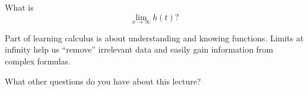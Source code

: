 \documentclass{ximera}
\begin{document}
\begin{question}
What is 
\[
\lim_{x\to\infty} h(t)?
\]
\begin{multipleChoice}
\end{multipleChoice}
\end{question}

Part of learning calculus is about understanding and knowing
functions. Limits at infinity help us ``remove'' irrelevant data and
easily gain information from complex formulas.

\begin{question}
What other questions do you have about this lecture?
\begin{freeResponse}
\end{freeResponse}
\end{question}
\end{document}
